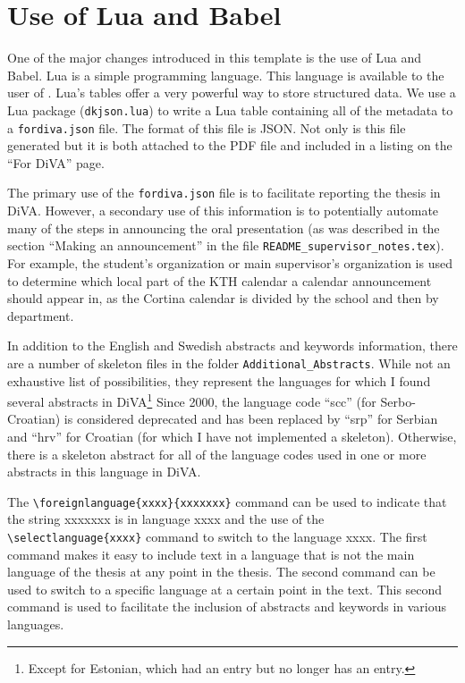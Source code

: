 \documentclass[12pt, twoside]{article}
\newcommand{\fname}[1]{\texttt{#1}}
\begin{document}
\section{Use of Lua and Babel}
One of the major changes introduced in this template is the use of Lua and Babel. Lua is a simple programming language. This language is available to the user of \LuaLaTeX{}. Lua's tables offer a very powerful way to store structured data. We use a Lua package (\fname{dkjson.lua}) to write a Lua table containing all of the metadata to a \fname{fordiva.json} file. The format of this file is \gls{JSON}. Not only is this file generated but it is both attached to the PDF file and included in a listing on the \enquote{For DiVA} page.

The primary use of the \fname{fordiva.json} file is to facilitate reporting the thesis in \gls{DiVA}. However, a secondary use of this information is to potentially automate many of the steps in announcing the oral presentation (as was described in the section \enquote{Making an announcement} in the file \fname{README\_supervisor\_notes.tex}).
For example, the student's organization or main supervisor's organization is used to determine which local part of the \gls{KTH} calendar a calendar announcement should appear in, as the Cortina calendar is divided by the school and then by department.


In addition to the English and Swedish abstracts and keywords information, there are a number of skeleton files in the folder \texttt{Additional\_Abstracts}. While not an exhaustive list of possibilities, they represent the languages for which I found several abstracts in DiVA\footnote{Except for Estonian, which had an entry but no longer has an entry.} Since 2000, the language code \enquote{scc} (for Serbo-Croatian) is considered deprecated and has been replaced by \enquote{srp} for Serbian and \enquote{hrv} for Croatian (for which I have not implemented a skeleton). Otherwise, there is a skeleton abstract for all of the language codes used in one or more abstracts in this language in \gls{DiVA}.

The \texttt{\textbackslash foreignlanguage\{xxxx\}\{xxxxxxx\}} command can be used to indicate that the string xxxxxxx is in language xxxx and the use of the \texttt{\textbackslash selectlanguage\{xxxx\}} command to switch to the language xxxx. The first command makes it easy to include text in a language that is not the main language of the thesis at any point in the thesis. The second command can be used to switch to a specific language at a certain point in the text. This second command is used to facilitate the inclusion of abstracts and keywords in various languages.
\end{document}
